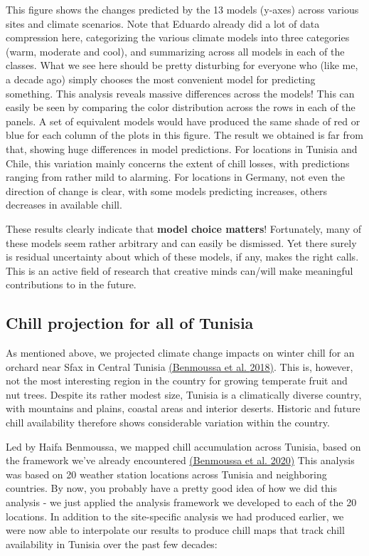 \documentclass[
]{book}
\begin{document}
This figure shows the changes predicted by the 13 models (y-axes) across various sites and climate scenarios. Note that Eduardo already did a lot of data compression here, categorizing the various climate models into three categories (warm, moderate and cool), and summarizing across all models in each of the classes. What we see here should be pretty disturbing for everyone who (like me, a decade ago) simply chooses the most convenient model for predicting something. This analysis reveals massive differences across the models! This can easily be seen by comparing the color distribution across the rows in each of the panels. A set of equivalent models would have produced the same shade of red or blue for each column of the plots in this figure. The result we obtained is far from that, showing huge differences in model predictions. For locations in Tunisia and Chile, this variation mainly concerns the extent of chill losses, with predictions ranging from rather mild to alarming. For locations in Germany, not even the direction of change is clear, with some models predicting increases, others decreases in available chill.

These results clearly indicate that \textbf{model choice matters}! Fortunately, many of these models seem rather arbitrary and can easily be dismissed. Yet there surely is residual uncertainty about which of these models, if any, makes the right calls. This is an active field of research that creative minds can/will make meaningful contributions to in the future.

\hypertarget{chill-projection-for-all-of-tunisia}{%
\subsection{Chill projection for all of Tunisia}\label{chill-projection-for-all-of-tunisia}}

As mentioned above, we projected climate change impacts on winter chill for an orchard near Sfax in Central Tunisia \href{https://link.springer.com/article/10.1007/s00484-018-1628-x}{(Benmoussa et al. \protect\hyperlink{ref-benmoussa2018climate}{2018})}. This is, however, not the most interesting region in the country for growing temperate fruit and nut trees. Despite its rather modest size, Tunisia is a climatically diverse country, with mountains and plains, coastal areas and interior deserts. Historic and future chill availability therefore shows considerable variation within the country.

Led by Haifa Benmoussa, we mapped chill accumulation across Tunisia, based on the framework we've already encountered \href{https://link.springer.com/article/10.1007/s10584-020-02774-7}{(Benmoussa et al. \protect\hyperlink{ref-benmoussa2020severe}{2020})} This analysis was based on 20 weather station locations across Tunisia and neighboring countries. By now, you probably have a pretty good idea of how we did this analysis - we just applied the analysis framework we developed to each of the 20 locations. In addition to the site-specific analysis we had produced earlier, we were now able to interpolate our results to produce chill maps that track chill availability in Tunisia over the past few decades:
\end{document}
